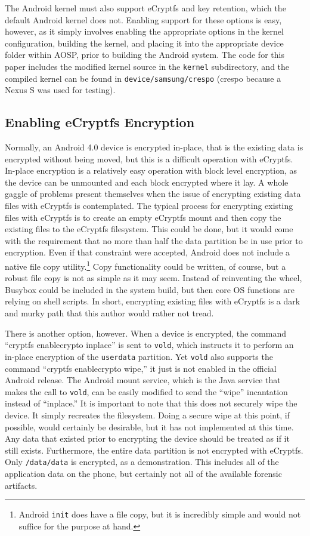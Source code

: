 The Android kernel must also support eCryptfs and key retention, which the default Android kernel does not. Enabling support for
these options is easy, however, as it simply involves enabling the appropriate options in the kernel configuration, building the
kernel, and placing it into the appropriate device folder within AOSP, prior to building the Android system. The code for this paper
includes the modified kernel source in the \texttt{kernel} subdirectory, and the compiled kernel can be found in
\texttt{device/samsung/crespo} (crespo because a Nexus S was used for testing).

\subsection{Enabling eCryptfs Encryption} Normally, an Android 4.0 device is encrypted in-place, that is the existing data is
encrypted without being moved, but this is a difficult operation with eCryptfs. In-place encryption is a relatively easy
operation with block level encryption, as the device can be unmounted and each block encrypted where it lay. A whole gaggle of
problems present themselves when the issue of encrypting existing data files with eCryptfs is contemplated.  The typical
process for encrypting existing files with eCryptfs is to create an empty eCryptfs mount and then copy the existing files to the
eCryptfs filesystem.  This could be done, but it would come with the requirement that no more than half the data partition be in use
prior to encryption. Even if that constraint were accepted, Android does not include a native file copy utility.\footnote{Android
\texttt{init} does have a file copy, but it is incredibly simple and would not suffice for the purpose at hand.} Copy functionality
could be written, of course, but a robust file copy is not as simple as it may seem. Instead of reinventing the wheel, Busybox could
be included in the system build, but then core OS functions are relying on shell scripts. In short, encrypting existing files with
eCryptfs is a dark and murky path that this author would rather not tread.

There is another option, however. When a device is encrypted, the command ``cryptfs enablecrypto inplace'' is sent to \texttt{vold},
which instructs it to perform an in-place encryption of the \texttt{userdata} partition. Yet \texttt{vold} also supports the command
``cryptfs enablecrypto wipe,'' it just is not enabled in the official Android release. The Android mount service, which is the Java
service that makes the call to \texttt{vold}, can be easily modified to send the ``wipe'' incantation instead of ``inplace.'' It is
important to note that this does not securely wipe the device. It simply recreates the filesystem. Doing a secure wipe at this
point, if possible, would certainly be desirable, but it has not implemented at this time. Any data that existed prior to encrypting
the device should be treated as if it still exists. Furthermore, the entire data partition is not encrypted with
eCryptfs. Only \texttt{/data/data} is encrypted, as a demonstration. This includes all of the application data on the phone, but
certainly not all of the available forensic artifacts.

